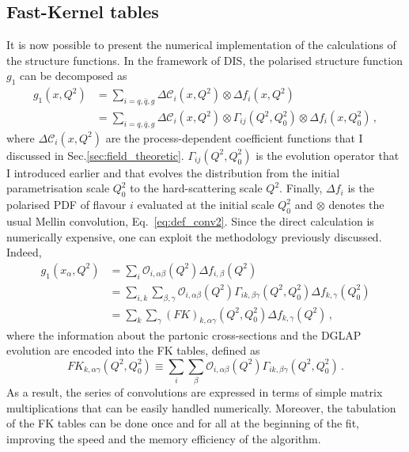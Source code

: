 \subsection*{Fast-Kernel tables}
It is now possible to present the numerical implementation of the calculations of the structure functions. In the framework of DIS, the polarised structure function $g_1$ can be decomposed as 
\begin{equation}
  \begin{split}
    g_1(x,Q^2) & = \sum_{i=q,\bar{q},g} \Delta \mathcal{C}_{i}(x,Q^2) \otimes \Delta f_i (x,Q^2) \\
    & = \sum_{i=q,\bar{q},g} \Delta \mathcal{C}_{i}(x,Q^2) \otimes \Gamma_{ij} (Q^2,Q^2_0) \otimes \Delta f_i (x,Q^2_0) \,,
  \end{split}
\end{equation}
where $\Delta \mathcal{C}_{i}(x,Q^2)$ are the process-dependent coefficient functions that I discussed in Sec.\ref{sec:field_theoretic}. $\Gamma_{ij} (Q^2,Q^2_0)$ is the evolution operator that I introduced earlier and that evolves the distribution from the initial parametrisation scale $Q^2_0$ to the hard-scattering scale $Q^2$. Finally, $\Delta f_i$ is the polarised PDF of flavour $i$ evaluated at the initial scale $Q^2_0$ and $\otimes$ denotes the usual Mellin convolution, Eq.~\eqref{eq:def_conv2}. Since the direct calculation is numerically expensive, one can exploit the methodology previously discussed. Indeed, 
\begin{equation}
  \begin{split}
    g_1 (x_{\alpha},Q^2) & = \sum_{i} \mathcal{O}_{i,\alpha \beta}(Q^2) \Delta f_{i,\beta}(Q^2) \\
    & = \sum_{i,k} \sum_{\beta, \gamma} \mathcal{O}_{i,\alpha \beta}(Q^2) \Gamma_{ik,\beta \gamma} (Q^2,Q^2_0) \Delta f_{k,\gamma}(Q^2_0) \\
    & = \sum_{k} \sum_{\gamma} \left( FK \right)_{k, \alpha \gamma} (Q^2,Q^2_0) \Delta f_{k, \gamma}(Q^2) \,,
    \label{eq:g1_FK}
  \end{split}
\end{equation}
where the information about the partonic cross-sections and the DGLAP evolution are encoded into the FK tables, defined as
\begin{equation}
  FK_{k, \alpha \gamma}  (Q^2, Q^2_0) \equiv \sum_i \sum_{\beta} \mathcal{O}_{i,\alpha \beta}(Q^2) \Gamma_{ik,\beta \gamma} (Q^2, Q^2_0)\,.
\end{equation}
As a result, the series of convolutions are expressed in terms of simple matrix multiplications that can be easily handled numerically. Moreover, the tabulation of the FK tables can be done once and for all at the beginning of the fit, improving the speed and the memory efficiency of the algorithm.%

